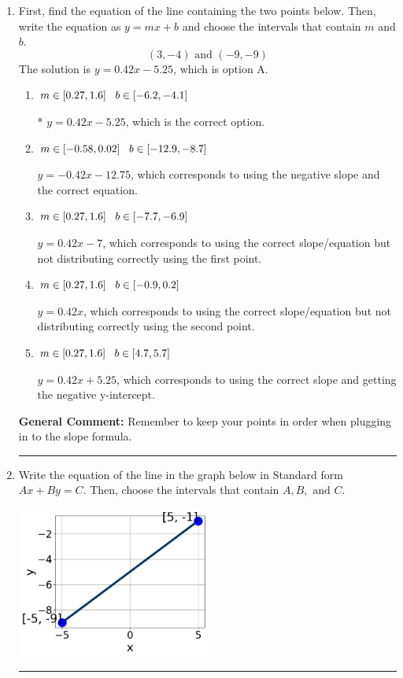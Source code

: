 \documentclass{extbook}[14pt]
\newcommand{\litem}[1]{\item #1

\rule{\textwidth}{0.4pt}}
\begin{document}
\begin{enumerate}\litem{
First, find the equation of the line containing the two points below. Then, write the equation as $ y=mx+b $ and choose the intervals that contain $m$ and $b$.
\[ (3, -4) \text{ and } (-9, -9) \]
The solution is \( y = 0.42x -5.25 \), which is option A.\begin{enumerate}[label=\Alph*.]
\item \( m \in [0.27, 1.6] \hspace*{3mm} b \in [-6.2, -4.1] \)

* $y = 0.42x -5.25$, which is the correct option.
\item \( m \in [-0.58, 0.02] \hspace*{3mm} b \in [-12.9, -8.7] \)

 $y = -0.42x -12.75$, which corresponds to using the negative slope and the correct equation.
\item \( m \in [0.27, 1.6] \hspace*{3mm} b \in [-7.7, -6.9] \)

 $y = 0.42x -7$, which corresponds to using the correct slope/equation but not distributing correctly using the first point.
\item \( m \in [0.27, 1.6] \hspace*{3mm} b \in [-0.9, 0.2] \)

 $y = 0.42x$, which corresponds to using the correct slope/equation but not distributing correctly using the second point.
\item \( m \in [0.27, 1.6] \hspace*{3mm} b \in [4.7, 5.7] \)

 $y = 0.42x + 5.25$, which corresponds to using the correct slope and getting the negative y-intercept.
\end{enumerate}

\textbf{General Comment:} Remember to keep your points in order when plugging in to the slope formula.
}
\litem{
Write the equation of the line in the graph below in Standard form $Ax+By=C$. Then, choose the intervals that contain $A, B, \text{ and } C$.

\begin{center}
    \includegraphics[width=0.5\textwidth]{../Figures/linearGraphToStandardCopyA.png}
\end{center}



}
\end{enumerate}
\end{document}

